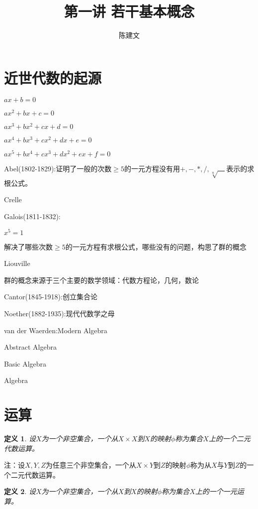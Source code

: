 \documentclass{article}
\newtheorem{Def}{定义}
\begin{document}
\begin{CJK*}{UTF8}{gbsn}
  \title{第一讲 若干基本概念}
  \author{陈建文}
  \maketitle
  

\section{近世代数的起源}


$ax+b=0$

$ax^2+bx+c=0$

$ax^3+bx^2+cx+d=0$

$ax^4+bx^3+cx^2+dx+e=0$

$ax^5+bx^4+cx^3+dx^2+ex+f=0$

Abel(1802-1829):证明了一般的次数$\geq 5$的一元方程没有用$+,-,*,/,\sqrt[n]{\quad}$表示的求根公式。

Crelle

Galois(1811-1832):

$x^5=1$

解决了哪些次数$\geq 5$的一元方程有求根公式，哪些没有的问题，构思了群的概念

Liouville

群的概念来源于三个主要的数学领域：代数方程论，几何，数论

Cantor(1845-1918):创立集合论

Noether(1882-1935):现代代数学之母

van der Waerden:Modern Algebra

Abstract Algebra

Basic Algebra

Algebra



\section{运算}
\begin{Def}
  设$X$为一个非空集合，一个从$X\times X$到$X$的映射$\phi$称为集合$X$上的一个二元代数运算。
\end{Def}
  
注：设$X,Y,Z$为任意三个非空集合，一个从$X\times Y$到$Z$的映射$\phi$称为从$X$与$Y$到$Z$的一个二元代数运算。

\begin{Def}
  设$X$为一个非空集合，一个从$X$到$X$的映射$\phi$称为集合$X$上的一个一元运算。
\end{Def}


\end{CJK*}
\end{document}
